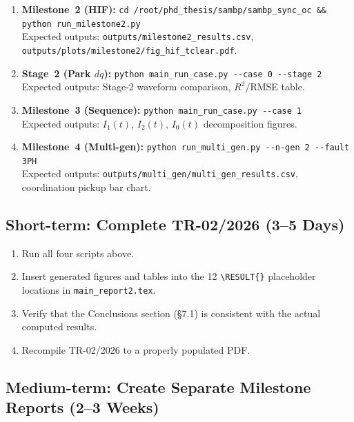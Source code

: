 \documentclass[12pt,a4paper]{article}
\begin{document}
\begin{enumerate}
  \item \textbf{Milestone~2 (HIF):}
        \verb|cd /root/phd_thesis/sambp/sambp_sync_oc && python run_milestone2.py|\\
        Expected outputs: \texttt{outputs/milestone2\_results.csv},
        \texttt{outputs/plots/milestone2/fig\_hif\_tclear.pdf}.

  \item \textbf{Stage~2 (Park $dq$):}
        \verb|python main_run_case.py --case 0 --stage 2|\\
        Expected outputs: Stage-2 waveform comparison, $R^2$/RMSE table.

  \item \textbf{Milestone~3 (Sequence):}
        \verb|python main_run_case.py --case 1|\\
        Expected outputs: $I_1(t)$, $I_2(t)$, $I_0(t)$ decomposition figures.

  \item \textbf{Milestone~4 (Multi-gen):}
        \verb|python run_multi_gen.py --n-gen 2 --fault 3PH|\\
        Expected outputs: \texttt{outputs/multi\_gen/multi\_gen\_results.csv},
        coordination pickup bar chart.
\end{enumerate}

\subsection{Short-term: Complete TR-02/2026 (3--5 Days)}
\label{sec:cor:tr02}

\begin{enumerate}
  \item Run all four scripts above.
  \item Insert generated figures and tables into the 12 \texttt{\textbackslash RESULT\{\}}
        placeholder locations in \texttt{main\_report2.tex}.
  \item Verify that the Conclusions section (\S7.1) is consistent with the
        actual computed results.
  \item Recompile TR-02/2026 to a properly populated PDF.
\end{enumerate}

\subsection{Medium-term: Create Separate Milestone Reports (2--3 Weeks)}
\label{sec:cor:separate}
\end{document}
